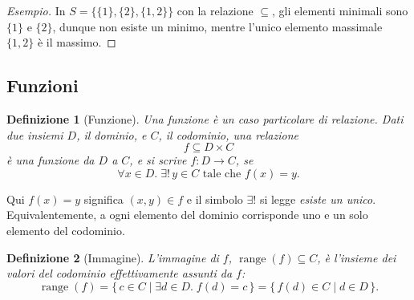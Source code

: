 \documentclass[a4paper, 11pt, oneside]{book}
\theoremstyle{formale}
\newtheorem*{definition}{Definizione}
\newenvironment{esempio}
    {\begin{proof}[\textit{Esempio}]\renewcommand{\qedsymbol}{$\diamond$}}
    {\end{proof}}
\begin{document}
    \begin{esempio}
        In $S = \{\{1\}, \{2\}, \{1, 2\}\}$ con la relazione $\subseteq$, gli elementi
        minimali sono $\{1\}$ e $\{2\}$, dunque non esiste un minimo, mentre l'unico elemento
        massimale $\{1, 2\}$ \`e il massimo.
    \end{esempio}

    \subsection{Funzioni}
    \begin{definition}[Funzione]
        Una funzione \`e un caso particolare di relazione. Dati due insiemi $D$, il
        \emph{dominio}, e $C$, il \emph{codominio}, una relazione
        \begin{equation*}
            f \subseteq D \times C
        \end{equation*}
        \`e una \emph{funzione} da $D$ a $C$, e si scrive $f \colon D \to C$, se
        \begin{equation*}
            \forall x \in D.\; \exists!\, y \in C \text{ tale che } f(x) = y.
        \end{equation*}
    \end{definition}
    Qui $f(x) = y$ significa $(x, y) \in f$ e il simbolo $\exists!$ si legge \emph{esiste
    un unico}. Equivalentemente, a ogni elemento del dominio corrisponde uno e un solo
    elemento del codominio.

    \begin{definition}[Immagine]
        L'\emph{immagine} di $f$, $\operatorname{range}(f) \subseteq C$, \`e l'insieme dei
        valori del codominio effettivamente assunti da $f$:
        \begin{equation*}
            \operatorname{range}(f)
            = \{\, c \in C \mid \exists d \in D.\; f(d) = c \,\}
            = \{\, f(d) \in C \mid d \in D \,\}.
        \end{equation*}
    \end{definition}
\end{document}
